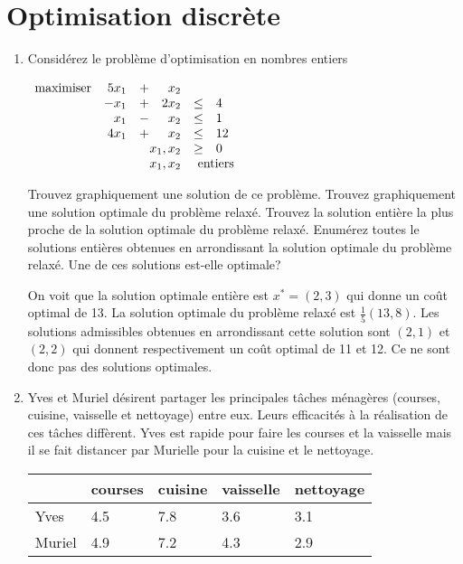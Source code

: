 \section{Optimisation discrète}

\begin{enumerate}

  \item Considérez le problème d'optimisation en nombres entiers

    $
    \begin{array}{lrcrcl}
      \maxi & 5x_1 & +&  x_2\\
      & -x_1 &+& 2 x_2  & \leq & 4 \\
      & x_1    & - &    x_2   &  \leq & 1\\
      &   4x_1& +&  x_2  & \leq & 12 \\
      &   \multicolumn{3}{r}{x_1, x_2}  & \geq & 0\\
      &   \multicolumn{3}{r}{x_1, x_2}  & \multicolumn{2}{l}{\mbox{ entiers}}
    \end{array}
    $

    Trouvez graphiquement une solution de ce problème. Trouvez graphiquement une solution optimale du problème relaxé. Trouvez la
    solution entière la plus proche de la solution optimale du problème relaxé. Enumérez toutes le solutions entières obtenues en
    arrondissant la solution optimale du problème relaxé. Une de ces solutions est-elle optimale?


    \begin{solution}
      On voit que la solution optimale entière est $x^* = (2,3)$ qui donne
      un coût optimal de 13.
      La solution optimale du problème relaxé est $\frac{1}{5}(13,8)$.
      Les solutions admissibles obtenues en arrondissant cette solution
      sont $(2,1)$ et $(2,2)$ qui donnent respectivement un coût optimal de
      11 et 12.
      Ce ne sont donc pas des solutions optimales.
    \end{solution}

  \item Yves et Muriel désirent partager les principales tâches ménagères  (courses, cuisine, vaisselle et nettoyage)
    entre eux. Leurs efficacités à la réalisation de ces tâches
    diffèrent. Yves est rapide pour faire les courses et la vaisselle mais il se fait distancer par Murielle pour la cuisine et le
    nettoyage.

    \begin{center}
      \begin{tabular}{l|llll}
        & courses & cuisine & vaisselle & nettoyage\\
        \hline
        Yves & 4.5 & 7.8 & 3.6 & 3.1\\
        Muriel & 4.9 & 7.2 & 4.3 & 2.9
      \end{tabular}
    \end{center}


\end{enumerate}

